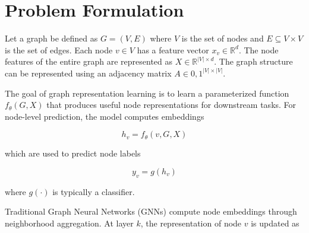 \documentclass[11pt]{article}
\begin{document}








\section{Problem Formulation}

Let a graph be defined as $G = (V, E)$ where $V$ is the set of nodes and $E \subseteq V \times V$ is the set of edges. Each node $v \in V$ has a feature vector $x_v \in \mathbb{R}^d$. The node features of the entire graph are represented as $X \in \mathbb{R}^{|V| \times d}$. The graph structure can be represented using an adjacency matrix $A \in {0,1}^{|V| \times |V|}$.

The goal of graph representation learning is to learn a parameterized function $f_\theta(G, X)$ that produces useful node representations for downstream tasks. For node-level prediction, the model computes embeddings

$$
h_v = f_\theta(v, G, X)
$$

which are used to predict node labels

$$
y_v = g(h_v)
$$

where $g(\cdot)$ is typically a classifier.

Traditional Graph Neural Networks (GNNs) compute node embeddings through neighborhood aggregation. At layer $k$, the representation of node $v$ is updated as
\end{document}
